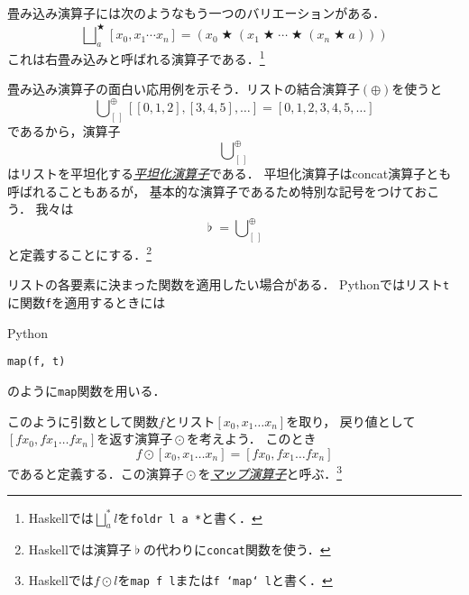 \documentclass[a5paper,draft]{jsbook}
\newcommand{\programminglanguage}[1]{\textsf{#1}}
\newcommand{\haskell}{\programminglanguage{Haskell}}
\newcommand{\python}{\programminglanguage{Python}}
\newcommand{\keyword}[1]{{\underline{\emph{#1}}}}
\newcommand{\code}[1]{\texttt{#1}}
\newenvironment{pythoncode}{\begin{itembox}[r]{\python}}{\end{itembox}}
\newcommand{\mathEmptyList}{{[\,]}}%
\DeclareMathOperator{\mathConcat}{\flat}%
\DeclareMathOperator*{\mathFold}{\bigcup}
\DeclareMathOperator*{\mathFoldRight}{\bigsqcup}
\newcommand{\mathBinaryOperator}[1]{\operatorname{#1}}
\newcommand{\mathAnyBinaryOperator}{\mathBinaryOperator{\bigstar}}
\newcommand{\mathAppend}{\oplus}
\newcommand{\mathMap}{\mathBinaryOperator{\odot}}
\begin{document}
畳み込み演算子には次のようなもう一つのバリエーションがある．
\begin{equation}
\mathFoldRight^{\mathAnyBinaryOperator}_{a}[x_0,x_1\dotsb x_n]=\left(x_0\mathAnyBinaryOperator\left(x_1\mathAnyBinaryOperator\dotsb\mathAnyBinaryOperator\left(x_n\mathAnyBinaryOperator a\right)\right)\right)
\end{equation}
これは右畳み込みと呼ばれる演算子である．\footnote{\haskell では$\mathFoldRight^{*}_{a}l$を\code{foldr l a *}と書く．}

畳み込み演算子の面白い応用例を示そう．リストの結合演算子$(\mathAppend)$を使うと
\begin{equation}
\mathFold_\mathEmptyList^\mathAppend[[0,1,2],[3,4,5],\dots]=[0,1,2,3,4,5,\dots]
\end{equation}
であるから，演算子
\begin{equation}
\mathFold_\mathEmptyList^\mathAppend
\end{equation}
はリストを平坦化する\keyword{平坦化演算子}である．
平坦化演算子はconcat演算子とも呼ばれることもあるが，
基本的な演算子であるため特別な記号をつけておこう．
我々は
\begin{equation}
\mathConcat=\mathFold_\mathEmptyList^\mathAppend
\end{equation}
と定義することにする．\footnote{\haskell では演算子$\mathConcat$の代わりに\code{concat}関数を使う．}

リストの各要素に決まった関数を適用したい場合がある．
\python ではリスト\code{t}に関数\code{f}を適用するときには
\begin{pythoncode}
\begin{verbatim}
map(f, t)
\end{verbatim}
\end{pythoncode}
のように\code{map}関数を用いる．

このように引数として関数$f$とリスト$[x_0,x_1\dots x_n]$を取り，
戻り値として$[fx_0,fx_1\dots fx_n]$を返す演算子$\mathMap$を考えよう．
このとき
\begin{equation}
f\mathMap[x_0,x_1\dots x_n]=[fx_0,fx_1\dots fx_n]
\end{equation}
であると定義する．この演算子$\mathMap$を\keyword{マップ演算子}と呼ぶ．\footnote{\haskell では$f\mathMap l$を\code{map f l}または\code{f `map` l}と書く．}
\end{document}

